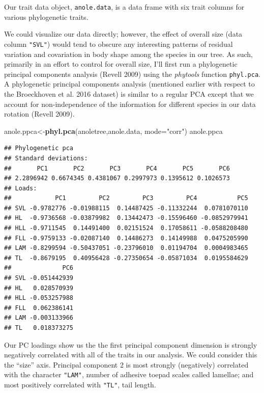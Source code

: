 \documentclass[fleqn,10pt,lineno]{wlpeerj} %
\newenvironment{Shaded}{\begin{snugshade}}{\end{snugshade}}
\newcommand{\AttributeTok}[1]{\textcolor[rgb]{0.13,0.29,0.53}{#1}}
\newcommand{\FunctionTok}[1]{\textcolor[rgb]{0.13,0.29,0.53}{\textbf{#1}}}
\newcommand{\NormalTok}[1]{#1}
\newcommand{\OtherTok}[1]{\textcolor[rgb]{0.56,0.35,0.01}{#1}}
\newcommand{\StringTok}[1]{\textcolor[rgb]{0.31,0.60,0.02}{#1}}
\begin{document}
Our trait data object, \texttt{anole.data}, is a data frame with six trait columns for various phylogenetic traits.

We could visualize our data directly; however, the effect of overall size (data column \texttt{"SVL"}) would tend to obscure any interesting patterns of residual variation and covariation in body shape among the species in our tree. As such, primarily in an effort to control for overall size, I'll first run a phylogenetic principal components analysis (Revell 2009) using the \emph{phytools} function \texttt{phyl.pca}. A phylogenetic principal components analysis (mentioned earlier with respect to the Broeckhoven et al. 2016 dataset) is similar to a regular PCA except that we account for non-independence of the information for different species in our data rotation (Revell 2009).

\begin{Shaded}
\begin{Highlighting}[]
\NormalTok{anole.ppca}\OtherTok{\textless{}{-}}\FunctionTok{phyl.pca}\NormalTok{(anoletree,anole.data,}
  \AttributeTok{mode=}\StringTok{"corr"}\NormalTok{)}
\NormalTok{anole.ppca}
\end{Highlighting}
\end{Shaded}

\begin{verbatim}
## Phylogenetic pca
## Standard deviations:
##       PC1       PC2       PC3       PC4       PC5       PC6 
## 2.2896942 0.6674345 0.4381067 0.2997973 0.1395612 0.1026573 
## Loads:
##            PC1         PC2         PC3         PC4           PC5
## SVL -0.9782776 -0.01988115  0.14487425 -0.11332244  0.0781070110
## HL  -0.9736568 -0.03879982  0.13442473 -0.15596460 -0.0852979941
## HLL -0.9711545  0.14491400  0.02151524  0.17058611 -0.0588208480
## FLL -0.9759133 -0.02087140  0.14486273  0.14149988  0.0475205990
## LAM -0.8299594 -0.50437051 -0.23796010  0.01194704  0.0004983465
## TL  -0.8679195  0.40956428 -0.27350654 -0.05871034  0.0195584629
##              PC6
## SVL -0.051442939
## HL   0.028570939
## HLL -0.053257988
## FLL  0.062386141
## LAM -0.003133966
## TL   0.018373275
\end{verbatim}

Our PC loadings show us the the first principal component dimension is strongly negatively correlated with all of the traits in our analysis. We could consider this the ``size'' axis. Principal component 2 is most strongly (negatively) correlated with the character \texttt{"LAM"}, number of adhesive toepad scales called lamellae; and most positively correlated with \texttt{"TL"}, tail length.
\end{document}
